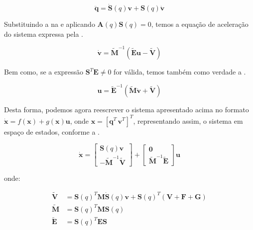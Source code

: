 \begin{equation}\label{eq:aprox_accel}
    \mathbf{\ddot{q}} = \mathbf{\dot{S}}(q)\mathbf{v} + \mathbf{S}(q)\mathbf{\dot{v}}
\end{equation}

Substituindo a  na  e aplicando $\mathbf{A}(q)\mathbf{S}(q)=0$, temos a equação de aceleração do sistema expressa pela .

\begin{equation}
    \mathbf{\dot{v}} = \mathbf{\tilde{M}}^{-1}\left(\mathbf{\tilde{E}u - \tilde{V}} \right)
    \label{eq:pseudovelo}
\end{equation}

Bem como, se a expressão $\mathbf{S}^T\mathbf{E} \neq 0$ for válida, temos também como verdade a .

\begin{equation}
    \mathbf{u} = \mathbf{\tilde{E}}^{-1}\left( \mathbf{\tilde{M}\dot{v}} + \mathbf{\tilde{V}} \right)
    \label{eq:pseudovelo2}
\end{equation}

Desta forma, podemos agora reescrever o sistema apresentado acima no formato $\mathbf{\dot{x}} = f(\mathbf{x})+ g(\mathbf{x})\mathbf{u}$,
onde $\mathbf{x} = \left[ \mathbf{q}^T \, \mathbf{v}^T \right]^T$, representando assim, o sistema em espaço de estados, conforme a .

\begin{equation*}
    \mathbf{\dot{x}} =
    \begin{bmatrix}
        \mathbf{S}(q)\mathbf{v} \\
        \mathbf{-\tilde{M}}^{-1}\mathbf{\tilde{V}}
    \end{bmatrix}
    +
    \begin{bmatrix}
        \mathbf{0} \\
        \mathbf{\tilde{M}}^{-1}\mathbf{\tilde{E}}
    \end{bmatrix} \mathbf{u}
    \label{eq:statespace}
\end{equation*}

\noindent onde:

\begin{equation*}
    \begin{split}
        \mathbf{\tilde{V}} & =
        \mathbf{S}(q)^T\mathbf{M}\mathbf{\dot{S}}(q)\mathbf{v} + \mathbf{S}(q)^T (\mathbf{V + F + G})\\
        \mathbf{\tilde{M}} & = \mathbf{S}(q)^T\mathbf{M}\mathbf{S}(q)\\
        \mathbf{\tilde{E}} & = \mathbf{S}(q)^T\mathbf{E}\mathbf{S}
    \end{split}
\end{equation*}

